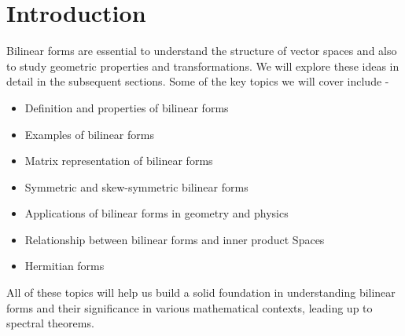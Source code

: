 \documentclass[openany]{book}
\begin{document}
\section{Introduction}
Bilinear forms are essential to understand the structure of vector spaces and also to study geometric properties and transformations. We will explore these ideas in detail in the subsequent sections. 
Some of the key topics we will cover include -
\begin{itemize}
    \item Definition and properties of bilinear forms
    \item Examples of bilinear forms
    \item Matrix representation of bilinear forms
    \item Symmetric and skew-symmetric bilinear forms
    \item Applications of bilinear forms in geometry and physics
    \item Relationship between bilinear forms and inner product Spaces
    \item Hermitian forms
\end{itemize}
All of these topics will help us build a solid foundation in understanding bilinear forms and their significance in various mathematical contexts, leading up to spectral theorems. 
\end{document}
